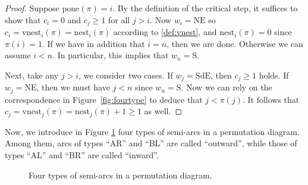 \documentclass[12pt]{amsart}
\numberwithin{equation}{section}
\theoremstyle{plain}
\theoremstyle{definition}
\def\S{\mathrm{S}}
\def\NE{\mathrm{NE}}
\def\SdE{\mathrm{SdE}}
\def\pone{\mathrm{pone}}
\def\vnest{\mathrm{vnest}}
\def\nest{\mathrm{nest}}
\begin{document}
\begin{proof}
Suppose $\pone(\pi)=i$. By the definition of the critical step, it suffices to show that $c_i=0$ and $c_j\ge 1$ for all $j>i$. Now $w_i=\NE$ so $c_i=\vnest_i(\pi)=\nest_i(\pi)$ according to \eqref{def:vnest}, and $\nest_i(\pi)=0$ since $\pi(i)=1$. If we have in addition that $i=n$, then we are done. Otherwise we can assume $i<n$. In particular, this implies that $w_n=\S$.

Next, take any $j>i$, we consider two cases. If $w_j=\SdE$, then $c_j\ge 1$ holds. If $w_j=\NE$, then we must have $j<n$ since $w_n=\S$. Now we can rely on the correspondence in Figure~\ref{fig:fourtype} to deduce that $j < \pi(j)$. It follows that $c_j=\vnest_j(\pi)=\nest_j(\pi)+1 \ge 1$ as well.
\end{proof}

Now, we introduce in Figure \ref{fig:fourtype2} four types of semi-arcs in a permutation diagram. Among them, arcs of types ``AR'' and ``BL'' are called ``outward'', while those of types ``AL'' and ``BR'' are called ``inward''.

\begin{figure}[!htbp]
\begin{center}
\caption{Four types of semi-arcs in a permutation diagram.}
\label{fig:fourtype2}
\end{center}
\end{figure}
\end{document}
